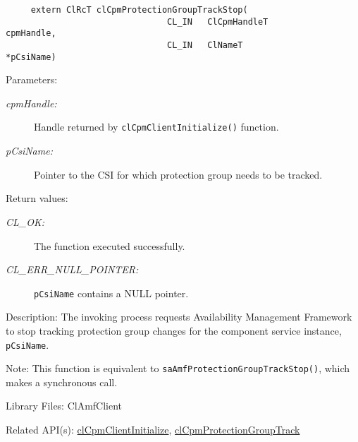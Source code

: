 {\begin{Desc}
\footnotesize\begin{verbatim}     extern ClRcT clCpmProtectionGroupTrackStop(
                      			CL_IN   ClCpmHandleT            cpmHandle,
                      			CL_IN   ClNameT                 *pCsiName)
\end{verbatim}
\normalsize
\end{Desc}
\begin{Desc}
\item[Parameters:]
\begin{description}
\item[{\em cpm\-Handle:}]Handle returned by {\tt{cl\-Cpm\-Client\-Initialize()}} function. 
\item[{\em p\-Csi\-Name:}]Pointer to the CSI for which protection group needs to be tracked.
\end{description}
\end{Desc}
\begin{Desc}
\item[Return values:]
\begin{description}
\item[{\em CL\_\-OK:}]The function executed successfully. 
\item[{\em CL\_\-ERR\_\-NULL\_\-POINTER:}]{\tt{pCsiName}} contains a NULL pointer.\end{description}
\end{Desc}
\begin{Desc}
\item[Description:]The invoking process requests Availability Management Framework to stop tracking protection group changes for the component service
instance, {\tt{p\-Csi\-Name}}.
\end{Desc}
\begin{Desc}
\item[Note:]This function is equivalent to {\tt{sa\-Amf\-Protection\-Group\-Track\-Stop()}}, which makes a synchronous call.\end{Desc}
\begin{Desc}
\item[Library Files:]Cl\-Amf\-Client\end{Desc}

\begin{Desc}
\item[Related API(s):]\hyperlink{group__group14}{cl\-Cpm\-Client\-Initialize}, \hyperlink{group__group14}{cl\-Cpm\-Protection\-Group\-Track} \end{Desc}

\newpage



}
